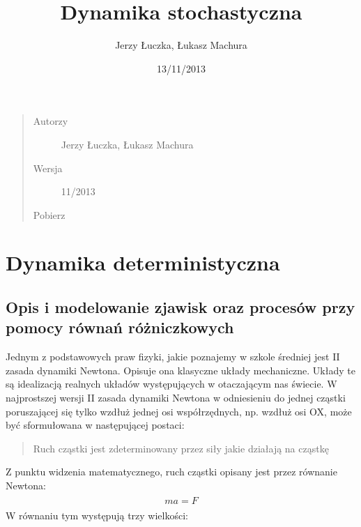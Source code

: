 \documentclass[a4paper,12pt,polish]{sphinxmanual}
\title{Dynamika stochastyczna}
\date{13/11/2013}
\author{Jerzy Łuczka, Łukasz Machura}
\begin{document}
\maketitle
\tableofcontents
{}\label{index::doc}

\begin{quote}\begin{description}
\item[{Autorzy}] \leavevmode
Jerzy Łuczka,
Łukasz Machura

\item[{Wersja}]  11/2013

\item[{Pobierz}] \leavevmode
{}

\end{description}\end{quote}


\chapter{Dynamika deterministyczna}
\label{index:dynamika-stochastyczna}\label{index:dynamika-deterministyczna}

\section{Opis i modelowanie zjawisk oraz procesów przy pomocy równań różniczkowych}
\label{ch1/chI011:opis-i-modelowanie-zjawisk-oraz-procesow-przy-pomocy-rownan-rozniczkowych}\label{ch1/chI011::doc}
Jednym z podstawowych praw fizyki, jakie poznajemy w szkole średniej jest II zasada dynamiki Newtona. Opisuje ona klasyczne układy mechaniczne. Układy te są idealizacją realnych układów występujących w otaczającym nas świecie. W najprostszej wersji II zasada dynamiki Newtona w odniesieniu do jednej cząstki poruszającej się tylko wzdłuż jednej osi współrzędnych, np. wzdłuż osi OX, może być sformułowana w następującej postaci:
\begin{quote}

Ruch cząstki jest zdeterminowany przez siły jakie działają na cząstkę
\end{quote}

Z punktu widzenia matematycznego, ruch cząstki opisany jest przez równanie Newtona:
\label{ch1/chI011:equation-eqn1}\begin{gather}
\begin{split}m a = F\end{split}\label{ch1/chI011-eqn1}
\end{gather}
W równaniu tym występują trzy wielkości:
\end{document}
